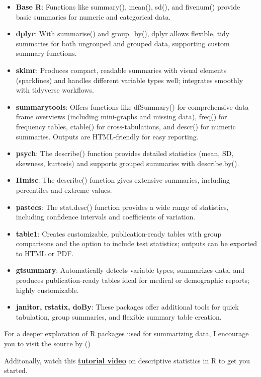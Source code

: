 \documentclass[
  man,
  floatsintext,
  longtable,
  nolmodern,
  notxfonts,
  notimes,
  colorlinks=true,linkcolor=blue,citecolor=blue,urlcolor=blue]{apa7}
\begin{document}
\begin{itemize}
\item
  \textbf{Base R}: Functions like summary(), mean(), sd(), and fivenum()
  provide basic summaries for numeric and categorical data.
\item
  \textbf{dplyr}: With summarise() and group\_by(), dplyr allows
  flexible, tidy summaries for both ungrouped and grouped data,
  supporting custom summary functions.
\item
  \textbf{skimr}: Produces compact, readable summaries with visual
  elements (sparklines) and handles different variable types well;
  integrates smoothly with tidyverse workflows.
\item
  \textbf{summarytools}: Offers functions like dfSummary() for
  comprehensive data frame overviews (including mini-graphs and missing
  data), freq() for frequency tables, ctable() for cross-tabulations,
  and descr() for numeric summaries. Outputs are HTML-friendly for easy
  reporting.
\item
  \textbf{psych}: The describe() function provides detailed statistics
  (mean, SD, skewness, kurtosis) and supports grouped summaries with
  describe.by().
\item
  \textbf{Hmisc}: The describe() function gives extensive summaries,
  including percentiles and extreme values.
\item
  \textbf{pastecs}: The stat.desc() function provides a wide range of
  statistics, including confidence intervals and coefficients of
  variation.
\item
  \textbf{table1}: Creates customizable, publication-ready tables with
  group comparisons and the option to include test statistics; outputs
  can be exported to HTML or PDF.
\item
  \textbf{gtsummary}: Automatically detects variable types, summarizes
  data, and produces publication-ready tables ideal for medical or
  demographic reports; highly customizable.
\item
  \textbf{janitor, rstatix, doBy}: These packages offer additional tools
  for quick tabulation, group summaries, and flexible summary table
  creation.
\end{itemize}

For a deeper exploration of R packages used for summarizing data, I
encourage you to visit the source by
()

Additonally, watch this
\href{https://www.youtube.com/watch?v=yoPGwvUzjgQ}{\textbf{tutorial
video}} on descriptive statistics in R to get you started.
\end{document}
